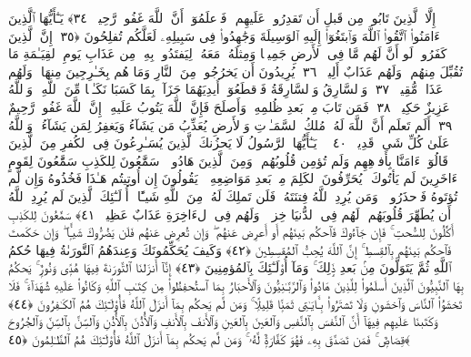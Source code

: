  إِلَّا ٱلَّذِينَ تَابُوا۟ مِن قَبلِ أَن تَقدِرُوا۟ عَلَيهِم ۖ فَٱعلَمُوٓا۟ أَنَّ ٱللَّهَ غَفُورٌۭ رَّحِيمٌۭ ﴿٣٤﴾
 يَـٰٓأَيُّهَا ٱلَّذِينَ ءَامَنُوا۟ ٱتَّقُوا۟ ٱللَّهَ وَٱبتَغُوٓا۟ إِلَيهِ ٱلوَسِيلَةَ وَجَٰهِدُوا۟ فِى سَبِيلِهِۦ لَعَلَّكُم تُفلِحُونَ ﴿٣٥﴾
 إِنَّ ٱلَّذِينَ كَفَرُوا۟ لَو أَنَّ لَهُم مَّا فِى ٱلأَرضِ جَمِيعًۭا وَمِثلَهُۥ مَعَهُۥ لِيَفتَدُوا۟ بِهِۦ مِن عَذَابِ يَومِ ٱلقِيَـٰمَةِ مَا تُقُبِّلَ مِنهُم ۖ وَلَهُم عَذَابٌ أَلِيمٌۭ ﴿٣٦﴾
 يُرِيدُونَ أَن يَخرُجُوا۟ مِنَ ٱلنَّارِ وَمَا هُم بِخَـٰرِجِينَ مِنهَا ۖ وَلَهُم عَذَابٌۭ مُّقِيمٌۭ ﴿٣٧﴾
 وَٱلسَّارِقُ وَٱلسَّارِقَةُ فَٱقطَعُوٓا۟ أَيدِيَهُمَا جَزَآءًۢ بِمَا كَسَبَا نَكَـٰلًۭا مِّنَ ٱللَّهِ ۗ وَٱللَّهُ عَزِيزٌ حَكِيمٌۭ ﴿٣٨﴾
 فَمَن تَابَ مِنۢ بَعدِ ظُلمِهِۦ وَأَصلَحَ فَإِنَّ ٱللَّهَ يَتُوبُ عَلَيهِ ۗ إِنَّ ٱللَّهَ غَفُورٌۭ رَّحِيمٌ ﴿٣٩﴾
 أَلَم تَعلَم أَنَّ ٱللَّهَ لَهُۥ مُلكُ ٱلسَّمَـٰوَٟتِ وَٱلأَرضِ يُعَذِّبُ مَن يَشَآءُ وَيَغفِرُ لِمَن يَشَآءُ ۗ وَٱللَّهُ عَلَىٰ كُلِّ شَىءٍۢ قَدِيرٌۭ ﴿٤٠﴾
 ۞ يَـٰٓأَيُّهَا ٱلرَّسُولُ لَا يَحزُنكَ ٱلَّذِينَ يُسَـٰرِعُونَ فِى ٱلكُفرِ مِنَ ٱلَّذِينَ قَالُوٓا۟ ءَامَنَّا بِأَفوَٟهِهِم وَلَم تُؤمِن قُلُوبُهُم ۛ وَمِنَ ٱلَّذِينَ هَادُوا۟ ۛ سَمَّٰعُونَ لِلكَذِبِ سَمَّٰعُونَ لِقَومٍ ءَاخَرِينَ لَم يَأتُوكَ ۖ يُحَرِّفُونَ ٱلكَلِمَ مِنۢ بَعدِ مَوَاضِعِهِۦ ۖ يَقُولُونَ إِن أُوتِيتُم هَـٰذَا فَخُذُوهُ وَإِن لَّم تُؤتَوهُ فَٱحذَرُوا۟ ۚ وَمَن يُرِدِ ٱللَّهُ فِتنَتَهُۥ فَلَن تَملِكَ لَهُۥ مِنَ ٱللَّهِ شَيـًٔا ۚ أُو۟لَـٰٓئِكَ ٱلَّذِينَ لَم يُرِدِ ٱللَّهُ أَن يُطَهِّرَ قُلُوبَهُم ۚ لَهُم فِى ٱلدُّنيَا خِزىٌۭ ۖ وَلَهُم فِى ٱلءَاخِرَةِ عَذَابٌ عَظِيمٌۭ ﴿٤١﴾
 سَمَّٰعُونَ لِلكَذِبِ أَكَّٰلُونَ لِلسُّحتِ ۚ فَإِن جَآءُوكَ فَٱحكُم بَينَهُم أَو أَعرِض عَنهُم ۖ وَإِن تُعرِض عَنهُم فَلَن يَضُرُّوكَ شَيـًۭٔا ۖ وَإِن حَكَمتَ فَٱحكُم بَينَهُم بِٱلقِسطِ ۚ إِنَّ ٱللَّهَ يُحِبُّ ٱلمُقسِطِينَ ﴿٤٢﴾
 وَكَيفَ يُحَكِّمُونَكَ وَعِندَهُمُ ٱلتَّورَىٰةُ فِيهَا حُكمُ ٱللَّهِ ثُمَّ يَتَوَلَّونَ مِنۢ بَعدِ ذَٟلِكَ ۚ وَمَآ أُو۟لَـٰٓئِكَ بِٱلمُؤمِنِينَ ﴿٤٣﴾
 إِنَّآ أَنزَلنَا ٱلتَّورَىٰةَ فِيهَا هُدًۭى وَنُورٌۭ ۚ يَحكُمُ بِهَا ٱلنَّبِيُّونَ ٱلَّذِينَ أَسلَمُوا۟ لِلَّذِينَ هَادُوا۟ وَٱلرَّبَّـٰنِيُّونَ وَٱلأَحبَارُ بِمَا ٱستُحفِظُوا۟ مِن كِتَـٰبِ ٱللَّهِ وَكَانُوا۟ عَلَيهِ شُهَدَآءَ ۚ فَلَا تَخشَوُا۟ ٱلنَّاسَ وَٱخشَونِ وَلَا تَشتَرُوا۟ بِـَٔايَـٰتِى ثَمَنًۭا قَلِيلًۭا ۚ وَمَن لَّم يَحكُم بِمَآ أَنزَلَ ٱللَّهُ فَأُو۟لَـٰٓئِكَ هُمُ ٱلكَـٰفِرُونَ ﴿٤٤﴾
 وَكَتَبنَا عَلَيهِم فِيهَآ أَنَّ ٱلنَّفسَ بِٱلنَّفسِ وَٱلعَينَ بِٱلعَينِ وَٱلأَنفَ بِٱلأَنفِ وَٱلأُذُنَ بِٱلأُذُنِ وَٱلسِّنَّ بِٱلسِّنِّ وَٱلجُرُوحَ قِصَاصٌۭ ۚ فَمَن تَصَدَّقَ بِهِۦ فَهُوَ كَفَّارَةٌۭ لَّهُۥ ۚ وَمَن لَّم يَحكُم بِمَآ أَنزَلَ ٱللَّهُ فَأُو۟لَـٰٓئِكَ هُمُ ٱلظَّـٰلِمُونَ ﴿٤٥﴾
